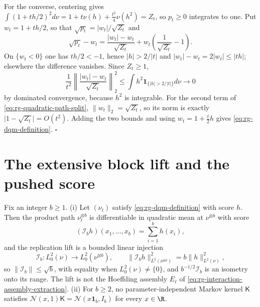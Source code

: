 For the converse, centering gives
\(\int(1+th/2)^2d\nu=1+t\nu(h)+\tfrac{t^2}4\nu(h^2)=Z_t\), so \(p_t\geq0\) integrates
to one. Put \(w_t=1+th/2\), so that \(\sqrt{p_t}=\lvert w_t\rvert/\sqrt{Z_t}\) and
\begin{equation}
\sqrt{p_t}-w_t
=\frac{\lvert w_t\rvert-w_t}{\sqrt{Z_t}}
+w_t\left(\frac1{\sqrt{Z_t}}-1\right).
\label{eq:rg-quadratic-path-split}
\end{equation}
On \(\{w_t<0\}\) one has \(th/2<-1\), hence \(\lvert h\rvert>2/\lvert t\rvert\) and
\(\lvert w_t\rvert-w_t=2\lvert w_t\rvert\leq\lvert th\rvert\); elsewhere the difference
vanishes. Since \(Z_t\geq1\),
\begin{equation}
\frac1{t^2}\left\lVert
\frac{\lvert w_t\rvert-w_t}{\sqrt{Z_t}}
\right\rVert_2^2
\leq\int h^2\mathbf 1_{\{\lvert h\rvert>2/\lvert t\rvert\}}d\nu
\longrightarrow0
\label{eq:rg-quadratic-path-tail}
\end{equation}
by dominated convergence, because \(h^2\) is integrable. For the second term of
\eqref{eq:rg-quadratic-path-split}, \(\lVert w_t\rVert_2=\sqrt{Z_t}\), so its norm is
exactly \(\lvert1-\sqrt{Z_t}\rvert=O(t^2)\). Adding the two bounds and using
\(w_t=1+\tfrac t2h\) gives \eqref{eq:rg-dqm-definition}. \hfill$\square$

\section{The extensive block lift and the pushed score}

Fix an integer \(b\geq1\). (i) Let \((\nu_t)\) satisfy \eqref{eq:rg-dqm-definition}
with score \(h\). Then the product path \(\nu_t^{\otimes b}\) is differentiable in
quadratic mean at \(\nu^{\otimes b}\) with score
\begin{equation}
(\mathscr I_bh)(x_1,\dots,x_b)=\sum_{i=1}^bh(x_i),
\label{eq:rg-score-replication}
\end{equation}
and the replication lift is a bounded linear injection
\begin{equation}
\mathscr I_b:L^2_0(\nu)\longrightarrow L^2_0(\nu^{\otimes b}),
\qquad
\lVert\mathscr I_bh\rVert_{L^2(\nu^{\otimes b})}^2
=b\lVert h\rVert_{L^2(\nu)}^2,
\label{eq:rg-score-replication-norm}
\end{equation}
so \(\lVert\mathscr I_b\rVert\leq\sqrt b\), with equality when \(L^2_0(\nu)\neq\{0\}\), and
\(b^{-1/2}\mathscr I_b\) is an isometry onto its range. The lift is not the Hoeffding assembly \(E_\ell\) of
\eqref{eq:rg-interaction-assembly-extraction}.
(ii) For \(b\geq2\), no parameter-independent Markov kernel \(\mathsf K\) satisfies
\(\mathcal N(x,1)\mathsf K=\mathcal N(x\mathbf 1_b,I_b)\) for every \(x\in\R\).

